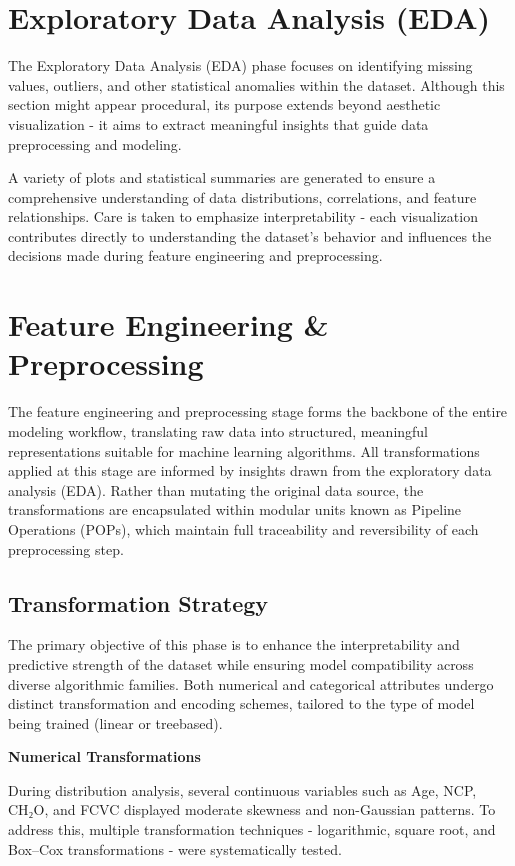 \section{Exploratory Data Analysis (EDA)}\label{sec:exploratory-data-analysis}
The Exploratory Data Analysis (EDA) phase focuses on identifying missing values, outliers, and other statistical anomalies within the dataset.
Although this section might appear procedural, its purpose extends beyond aesthetic visualization - it aims to extract meaningful insights that guide data preprocessing and modeling.

A variety of plots and statistical summaries are generated to ensure a comprehensive understanding of data distributions, correlations, and feature relationships.
Care is taken to emphasize interpretability - each visualization contributes directly to understanding the dataset’s behavior and influences the decisions made during feature engineering and preprocessing.


\section{Feature Engineering & Preprocessing}\label{sec:data-preprocessing}
The feature engineering and preprocessing stage forms the backbone of the entire modeling workflow, translating raw data into structured, meaningful representations suitable for machine learning algorithms.
All transformations applied at this stage are informed by insights drawn from the exploratory data analysis (EDA). Rather than mutating the original data source, the transformations are encapsulated within modular units known as Pipeline Operations (POPs), which maintain full traceability and reversibility of each preprocessing step.

\subsection{Transformation Strategy}\label{subsec:transformation-strategy}
The primary objective of this phase is to enhance the interpretability and predictive strength of the dataset while ensuring model compatibility across diverse algorithmic families.
Both numerical and categorical attributes undergo distinct transformation and encoding schemes, tailored to the type of model being trained (linear or treebased).

\textbf{Numerical Transformations}

During distribution analysis, several continuous variables such as Age, NCP, CH₂O, and FCVC displayed moderate skewness and non-Gaussian patterns.
To address this, multiple transformation techniques - logarithmic, square root, and Box–Cox transformations - were systematically tested.

